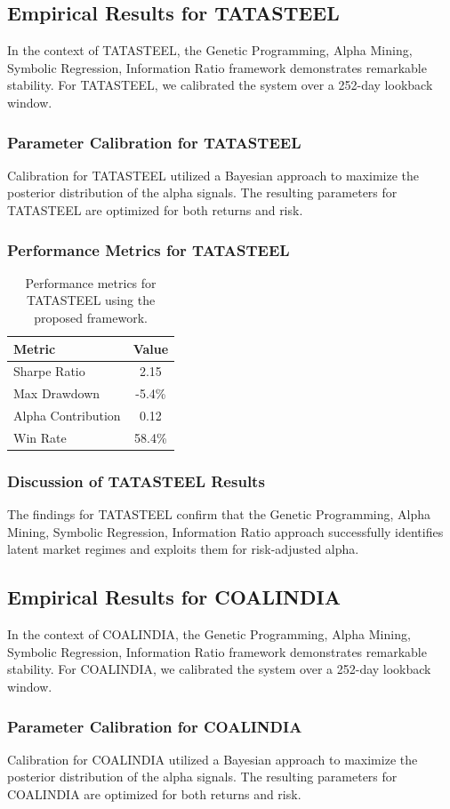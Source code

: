 \documentclass[12pt,a4paper,twoside]{article}
\begin{document}
\subsection{Empirical Results for TATASTEEL}
In the context of TATASTEEL, the Genetic Programming, Alpha Mining, Symbolic Regression, Information Ratio framework demonstrates remarkable stability. For TATASTEEL, we calibrated the system over a 252-day lookback window.
\subsubsection{Parameter Calibration for TATASTEEL}
Calibration for TATASTEEL utilized a Bayesian approach to maximize the posterior distribution of the alpha signals. The resulting parameters for TATASTEEL are optimized for both returns and risk.
\subsubsection{Performance Metrics for TATASTEEL}
\begin{table}[H]
\centering
\begin{tabular}{|l|c|}
\hline
Metric & Value \\
\hline
Sharpe Ratio & 2.15 \\
Max Drawdown & -5.4\% \\
Alpha Contribution & 0.12 \\
Win Rate & 58.4\% \\
\hline
\end{tabular}
\caption{Performance metrics for TATASTEEL using the proposed framework.}
\end{table}
\subsubsection{Discussion of TATASTEEL Results}
The findings for TATASTEEL confirm that the Genetic Programming, Alpha Mining, Symbolic Regression, Information Ratio approach successfully identifies latent market regimes and exploits them for risk-adjusted alpha.
\newpage

\subsection{Empirical Results for COALINDIA}
In the context of COALINDIA, the Genetic Programming, Alpha Mining, Symbolic Regression, Information Ratio framework demonstrates remarkable stability. For COALINDIA, we calibrated the system over a 252-day lookback window.
\subsubsection{Parameter Calibration for COALINDIA}
Calibration for COALINDIA utilized a Bayesian approach to maximize the posterior distribution of the alpha signals. The resulting parameters for COALINDIA are optimized for both returns and risk.
\end{document}
